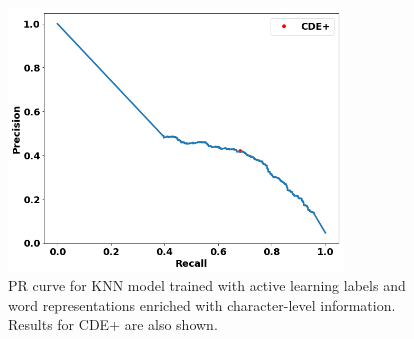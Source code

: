 \begin{figure}
\centering
\includegraphics[trim=0in 0.1in 0.1in 0.in,clip,width=3.5in]{figures/fasttext_prc_al_corpus_round5_100}
\caption{PR curve for KNN model trained with active learning labels and word representations enriched with character-level information. Results for CDE+ are also shown.
}
\label{fig:UBS_prcs_fasttext}
\end{figure}











